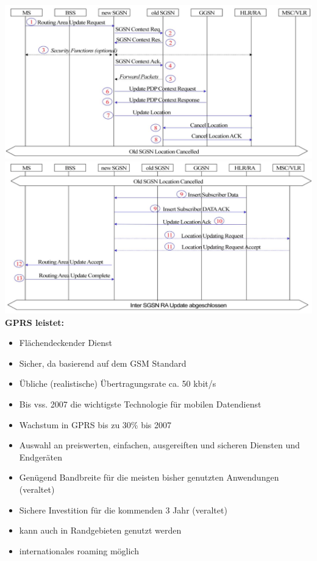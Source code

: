 \begin{minipage}{0.5 \linewidth}
\includegraphics[width = \linewidth]{./Pics/interSGSN} \\
\includegraphics[width = \linewidth]{./Pics/interSGSN2} \\
\large{\textbf{GPRS leistet:}}
\begin{itemize}
\item Flächendeckender Dienst
\item Sicher, da basierend auf dem GSM Standard
\item Übliche (realistische) Übertragungsrate ca. 50 kbit/s
\item Bis vss. 2007 die  wichtigste Technologie für mobilen Datendienst
\item Wachstum in GPRS bis zu 30\% bis 2007
\item Auswahl an preiswerten, einfachen, ausgereiften und sicheren Diensten und Endgeräten
\item Genügend Bandbreite für die meisten bisher genutzten Anwendungen (veraltet)
\item Sichere Investition für die kommenden 3 Jahr (veraltet)
\item kann auch in Randgebieten genutzt werden
\item internationales roaming möglich
\end{itemize}
\end{minipage}

